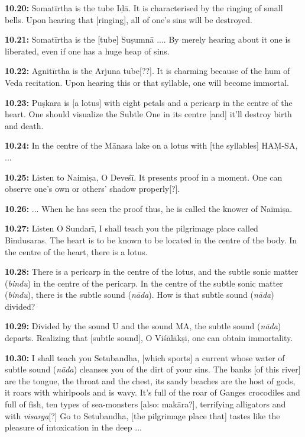 \documentclass{article}
\newcommand{\vsnum}[1]{\textbf{#1}}
\newcommand{\skt}[1]{\textit{#1}}
\begin{document}
\vsnum{10.20: }Somatīrtha is the tube Iḍā. It is characterised by the ringing of small bells. Upon hearing that [ringing], all of one's sins will be destroyed.

\vsnum{10.21: }Somatīrtha is the [tube] Suṣumnā .... By merely hearing about it one is liberated, even if one has a huge heap of sins.

\vsnum{10.22: }Agnitīrtha is the Arjuna tube[??]. It is charming because of the hum of Veda recitation. Upon hearing this or that syllable, one will become immortal.

\vsnum{10.23: }Puṣkara is [a lotus] with eight petals and a pericarp in the centre of the heart. One should visualize the Subtle One in its centre [and] it'll destroy birth and death.

\vsnum{10.24: }In the centre of the Mānasa lake on a lotus with [the syllables] HAṂ-SA, ...

\vsnum{10.25: }Listen to Naimiṣa, O Deveśī. It presents proof in a moment. One can observe one's own or others' shadow properly[?].

\vsnum{10.26: }... When he has seen the proof thus, he is called the knower of Naimiṣa.

\vsnum{10.27: }Listen O Sundarī, I shall teach you the pilgrimage place called Bindusaras. The heart is to be known to be located in the centre of the body. In the centre of the heart, there is a lotus.

\vsnum{10.28: }There is a pericarp in the centre of the lotus, and the subtle sonic matter (\skt{bindu}) in the centre of the pericarp. In the centre of the subtle sonic matter (\skt{bindu}), there is the subtle sound (\skt{nāda}). How is that subtle sound (\skt{nāda}) divided?

\vsnum{10.29: }Divided by the sound U and the sound MA, the subtle sound (\skt{nāda}) departs. Realizing that [subtle sound], O Viśālākṣi, one can obtain immortality.

\vsnum{10.30: }I shall teach you Setubandha, [which sports] a current whose water of subtle sound (\skt{nāda}) cleanses you of the dirt of your sins. The banks [of this river] are the tongue, the throat and the chest, its sandy beaches are the host of gods, it roars with whirlpools and is wavy. It's full of the roar of Ganges crocodiles and full of fish, ten types of sea-monsters [also: makāra?], terrifying alligators and with \skt{visarga}[?] Go to Setubandha, [the pilgrimage place that] tastes like the pleasure of intoxication in the deep ... 
\end{document}
